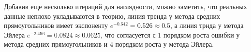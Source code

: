 \documentclass[11pt,a4paper,oneside]{article}
\begin{document}
Добавив еще несколько итераций для наглядности, можно заметить, что реальных данные неплохо укладываются в теорию, линия тренда у метода средних прямоугольников имеет экспоненту $e^{-0.642} = 0.526 \approx 0.5$, а линия трнда у метода Эйлера $e^{-2.496} = 0.0824 \approx 0.0625$, что согласуется с 1 порядком роста ошибки у метода средних прямоугольников и 4 порядком роста у метода Эйлера.
\end{document}
